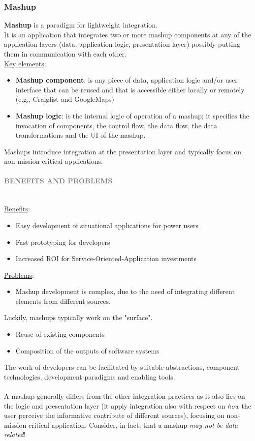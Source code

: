 \documentclass[10pt,a4paper]{article}
\newcommand{\nline}{\\~\\}
\newcommand{\myparagraph}[1]{\paragraph{\normalsize{\textcolor{gray}{\uppercase{\textbf{#1}}}} }\mbox{} \vspace{0.5em}\\}
\begin{document}
\begin{justify}
\subsubsection{Mashup}
\textbf{Mashup} is a paradigm for lightweight integration. \\
It is an application that integrates two or more mashup components at any of the application layers (data, application logic, presentation layer) possibly putting them in communication with each other. \\
\uline{Key elements}:
\begin{itemize}
	\item \textbf{Mashup component}: is any piece of data, application logic and/or user interface that can be reused and that is accessible either locally or remotely (e.g., Craiglist and GoogleMaps)
	\item \textbf{Mashup logic}: is the internal logic of operation of a mashup; it specifies the invocation of components, the control flow, the data flow, the data transformations and the UI of the mashup.
\end{itemize}
Mashups introduce integration at the presentation layer and typically focus on non-mission-critical applications. 
\myparagraph{Benefits and Problems}
\uline{Benefits}:
\begin{itemize}
	\item Easy development of situational applications for power users
	\item Fast prototyping for developers
	\item Increased ROI for Service-Oriented-Application investments
\end{itemize}
\uline{Problems}: \\
\begin{itemize}
    \item Mashup development is complex, due to the need of integrating different elements from different sources.
\end{itemize} 
Luckily, mashups typically work on the "surface".
\begin{itemize}
	\item Reuse of existing components
	\item Composition of the outputs of software systems
\end{itemize}
The work of developers can be facilitated by suitable abstractions, component technologies, development paradigms and enabling tools. \nline
A mashup generally differs from the other integration practices as it also lies on the logic and presentation layer (it apply integration also with respect on \textit{how} the user perceive the informative contribute of different sources), focusing on non-mission-critical application. Consider, in fact, that a mashup \textit{may not be data related}!

\end{justify}
\end{document}
